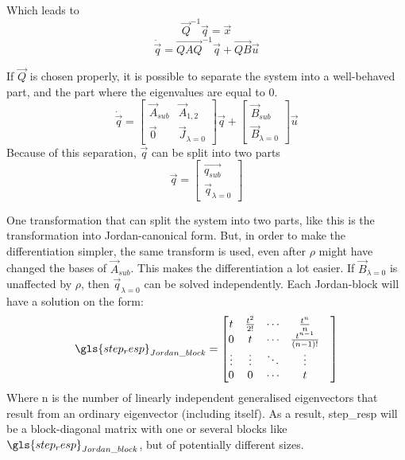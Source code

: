 Which leads to 
\begin{equation}
    \Vec{Q}^{-1}\Vec{q} = \Vec{x}
\end{equation}
\begin{equation}
    \dot{\Vec{q}} = \Vec{QAQ}^{-1}\Vec{q} + \Vec{QB}\Vec{u}
\end{equation}

If $\Vec{Q}$ is chosen properly, it is possible to separate the system into a well-behaved part, and the part where the eigenvalues are equal to 0.
\begin{equation}
    \dot{\Vec{q}}=
    \begin{bmatrix}
        \Vec{A}_{sub} & \Vec{A}_{1,2}\\
        \Vec{0} & \Vec{J}_{\lambda=0}
    \end{bmatrix}
    \Vec{q}
    + 
    \begin{bmatrix}
        \Vec{B}_{sub}\\
        \Vec{B}_{\lambda=0}
    \end{bmatrix}
    \Vec{u}
\end{equation}
Because of this separation, $\Vec{q}$ can be split into two parts
\begin{equation}
    \Vec{q}= \begin{bmatrix}
        \Vec{q_{sub}}\\
        \Vec{q}_{\lambda =0}
    \end{bmatrix}
\end{equation}


One transformation that can split the system into two parts, like this is the transformation into Jordan-canonical form. But, in order to make the differentiation simpler, the same transform is used, even after $\rho$ might have changed the bases of $\Vec{A}_{sub}$. This makes the differentiation a lot easier. 
\noindent
If $\Vec{B}_{\lambda=0}$ is unaffected by $\rho$, then $\Vec{q}_{\lambda=0}$ can be solved independently. Each Jordan-block will have a solution on the form: 
\begin{equation}
    \gls{step_resp}_{Jordan\_block} = 
    \begin{bmatrix}
        t & \frac{t^2}{2!} & \cdots & \frac{t^{n}}{n}\\
        0 & t  & \cdots & \frac{t^{n-1}}{(n-1)!}\\
        \vdots & \vdots & \ddots & \vdots & \\
        0 & 0 & \cdots & t
    \end{bmatrix}    
\end{equation}
Where n is the number of linearly independent generalised eigenvectors that result from an ordinary eigenvector (including itself). As a result, \gls{step_resp} will be a block-diagonal matrix with one or several blocks like $\gls{step_resp}_{Jordan\_block}$, but of potentially different sizes.

